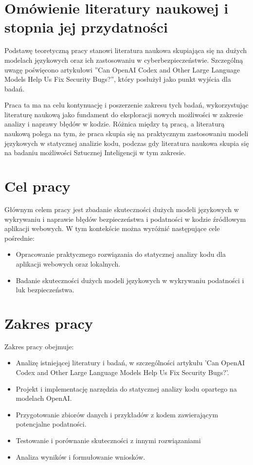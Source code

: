 \section*{Omówienie literatury naukowej i stopnia jej przydatności}
Podstawę teoretyczną pracy stanowi literatura naukowa skupiająca się na dużych modelach językowych oraz ich zastosowaniu w cyberbezpieczeństwie. Szczególną uwagę poświęcono artykułowi ''Can OpenAI Codex and Other Large Language Models Help Us Fix Security Bugs?'', który posłużył jako punkt wyjścia dla badań. 

Praca ta ma na celu kontynuację i poszerzenie zakresu tych badań, wykorzystując literaturę naukową jako fundament do eksploracji nowych możliwości w zakresie analizy i naprawy błędów w kodzie.
Różnica między tą pracą, a literaturą naukową polega na tym, że praca skupia się na praktycznym zastosowaniu modeli językowych w statycznej analizie kodu, podczas gdy literatura naukowa skupia się na badaniu możliwości Sztucznej Inteligencji w tym zakresie.

\section*{Cel pracy}
Głównym celem pracy jest zbadanie skuteczności dużych modeli językowych w wykrywaniu i naprawie błędów bezpieczeństwa i podatności w kodzie źródłowym aplikacji webowych. 
W tym kontekście można wyróżnić następujące cele pośrednie:
\begin{itemize}
    \item Opracowanie praktycznego rozwiązania do statycznej analizy kodu dla aplikacji webowych oraz lokalnych.
    \item Badanie skuteczności dużych modeli językowych w wykrywaniu podatności i luk bezpieczeństwa.
\end{itemize}
\section*{Zakres pracy}
Zakres pracy obejmuje:
\begin{itemize}
    \item Analizę istniejącej literatury i badań, w szczególności artykułu 'Can OpenAI Codex and Other Large Language Models Help Us Fix Security Bugs?'.
    \item Projekt i implementację narzędzia do statycznej analizy kodu opartego na modelach OpenAI.
    \item Przygotowanie zbiorów danych i przykładów z kodem zawierającym potencjalne podatności.
    \item Testowanie i porównanie skuteczności z innymi rozwiązaniami
    \item Analiza wyników i formułowanie wniosków.
\end{itemize}